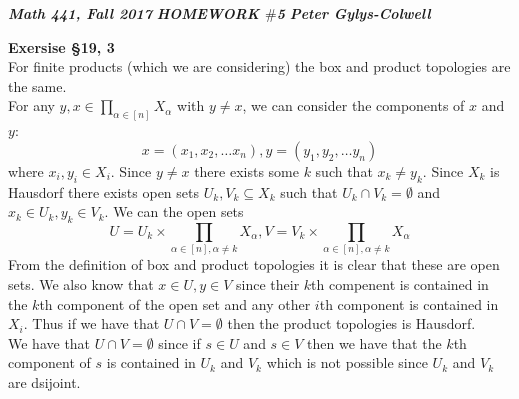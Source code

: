 \documentclass[12pt]{article}
\newenvironment{ques}[1]{\textbf{Exersise #1}\vspace{1 mm}\\ }{\bigskip}
\theoremstyle{definition}
\renewcommand{\a}{\alpha}
\begin{document}
\noindent \textit{\textbf{Math 441, Fall 2017}} \hspace{1.3cm}
\textit{\textbf{HOMEWORK $\#$5}} \hspace{1.3cm} \textit{\textbf{Peter
Gylys-Colwell}} 

\vspace{1cm}

\begin{ques}{\S 19, 3}
	For finite products (which we are considering) the box and product
	topologies are the same.\\
	For any $y, x \in \prod_{\a \in [n]} X_\a$ with $y \neq x$, we can consider the
	components of $x$ and $y$:
	$$x = (x_1, x_2, \dots x_n), y = (y_1, y_2, \dots y_n)$$
	where $x_i, y_i \in X_i$. Since $y \neq x$ there exists some $k$ such that
	$x_k \neq y_k$. Since $X_k$ is Hausdorf there exists open sets $U_k, V_k
	\subseteq X_k$ such that $U_k \cap V_k = \emptyset$ and $x_k \in U_k, y_k
	\in V_k$. We can the open sets 
	$$U = U_k \times \prod_{\a \in [n], \a \neq k} X_\a, V = V_k \times \prod_{\a
	\in [n], \a \neq k} X_\a$$
	From the definition of box and product topologies it is clear that these
	are open sets. We also know that $x \in U, y \in V$ since their $k$th
	compenent is contained in the $k$th component of the open set and any other
	$i$th component is contained in $X_i$. Thus if we have that $U \cap V =
	\emptyset$ then the product topologies is Hausdorf.\\
	We have that $U \cap V = \emptyset$ since if $s \in U$ and $s \in V$ then
	we have that the $k$th component of $s$ is contained in $U_k$ and $V_k$
	which is not possible since $U_k$ and $V_k$ are dsijoint.
\end{ques}
\end{document}
